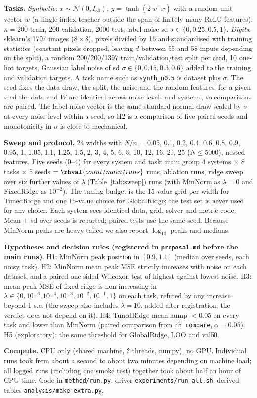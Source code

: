 \textbf{Tasks.} \emph{Synthetic}: $x\sim\mathcal N(0,I_{50})$, $y=\tanh(2\,w^\top x)$ with a random unit vector $w$ (a single-index teacher outside the span of finitely many ReLU features), $n=200$ train, 200 validation, 2000 test; label-noise sd $\sigma\in\{0,0.25,0.5,1\}$. \emph{Digits}: sklearn's 1797 images ($8\times8$), pixels divided by 16 and standardised with training statistics (constant pixels dropped, leaving $d$ between 55 and 58 inputs depending on the split), a random 200/200/1397 train/validation/test split per seed, 10 one-hot targets, Gaussian label noise of sd $\sigma\in\{0,0.15,0.3,0.6\}$ added to the training and validation targets. A task name such as \texttt{synth\_n0.5} is dataset plus $\sigma$. The seed fixes the data draw, the split, the noise and the random features; for a given seed the data and $W$ are identical across noise levels and systems, so comparisons are paired. The label-noise vector is the same standard-normal draw scaled by $\sigma$ at every noise level within a seed, so H2 is a comparison of five paired seeds and monotonicity in $\sigma$ is close to mechanical.

\textbf{Sweep and protocol.} 24 widths with $N/n$ = 0.05, 0.1, 0.2, 0.4, 0.6, 0.8, 0.9, 0.95, 1, 1.05, 1.1, 1.25, 1.5, 2, 3, 4, 5, 6, 8, 10, 12, 16, 20, 25 ($N\le5000$), nested features. Five seeds (0--4) for every system and task: main group 4 systems $\times$ 8 tasks $\times$ 5 seeds $=\rhval{count/main/runs}$ runs, ablation  runs, ridge sweep over six further values of $\lambda$ (Table~\ref{tab:sweep})  runs (with MinNorm as $\lambda=0$ and FixedRidge as $10^{-2}$). The tuning budget is the 15-value grid per width for TunedRidge and one 15-value choice for GlobalRidge; the test set is never used for any choice. Each system sees identical data, grid, solver and metric code. Mean $\pm$ sd over seeds is reported; paired tests use the same seed. Because MinNorm peaks are heavy-tailed we also report $\log_{10}$ peaks and medians.

\textbf{Hypotheses and decision rules (registered in \texttt{proposal.md} before the main runs).} H1: MinNorm peak position in $[0.9,1.1]$ (median over seeds, each noisy task). H2: MinNorm mean peak MSE strictly increases with noise on each dataset, and a paired one-sided Wilcoxon test of highest against lowest noise. H3: mean peak MSE of fixed ridge is non-increasing in $\lambda\in\{0,10^{-6},10^{-4},10^{-3},10^{-2},10^{-1},1\}$ on each task, refuted by any increase beyond 1 s.e. (the sweep also includes $\lambda=10$, added after registration; the verdict does not depend on it). H4: TunedRidge mean hump $<0.05$ on every task and lower than MinNorm (paired comparison from \texttt{rh compare}, $\alpha=0.05$). H5 (exploratory): the same threshold for GlobalRidge, LOO and val50.

\textbf{Compute.} CPU only (shared machine, 2 threads, numpy), no GPU. Individual runs took from about a second to about two minutes depending on machine load; all  logged runs (including one smoke test) together took about half an hour of CPU time. Code in \texttt{method/run.py}, driver \texttt{experiments/run\_all.sh}, derived tables \texttt{analysis/make\_extra.py}.
